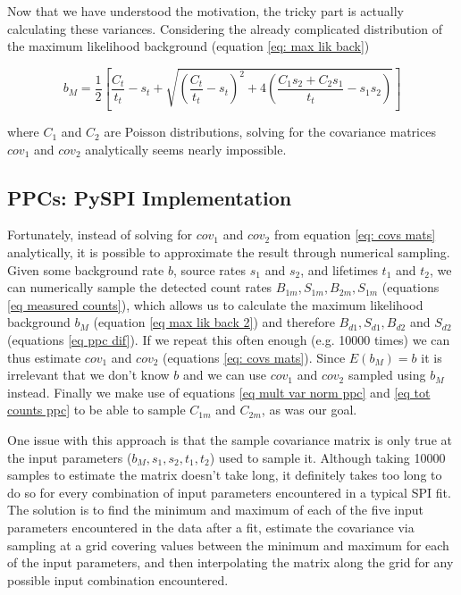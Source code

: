 \documentclass{report}
\begin{document}
Now that we have understood the motivation, the tricky part is actually calculating these variances. Considering the already complicated distribution of the maximum likelihood background (equation \ref{eq: max lik back})

\begin{equation}\label{eq max lik back 2}
  b_M = \frac{1}{2} \left[ \frac{C_t}{t_t} - s_t + \sqrt{\left( \frac{C_t}{t_t} - s_t\right)^2 + 4 \left( \frac{C_1s_2+C_2s_1}{t_t}-s_1s_2\right)}\right]
\end{equation}

where $C_1$ and $C_2$ are Poisson distributions, solving for the covariance matrices $cov_1$ and $cov_2$ analytically seems nearly impossible.


\subsection{PPCs: PySPI Implementation}

Fortunately, instead of solving for $cov_1$ and $cov_2$ from equation \ref{eq: covs mats} analytically, it is possible to approximate the result through numerical sampling. Given some background rate $b$, source rates $s_1$ and $s_2$, and lifetimes $t_1$ and $t_2$, we can numerically sample the detected count rates $B_{1m}, S_{1m}, B_{2m}, S_{1m}$ (equations \ref{eq measured counts}), which allows us to calculate the maximum likelihood background $b_M$ (equation \ref{eq max lik back 2}) and therefore $B_{d1},S_{d1},B_{d2}$ and $S_{d2}$ (equations \ref{eq ppc dif}). If we repeat this often enough (e.g. 10000 times) we can thus estimate $cov_1$ and $cov_2$ (equations \ref{eq: covs mats}). Since $E(b_M) = b$ it is irrelevant that we don't know $b$ and we can use $cov_1$ and $cov_2$ sampled using $b_M$ instead. Finally we make use of equations \ref{eq mult var norm ppc} and \ref{eq tot counts ppc} to be able to sample $C_{1m}$ and $C_{2m}$, as was our goal.

One issue with this approach is that the sample covariance matrix is only true at the input parameters ($b_M,s_1,s_2,t_1,t_2$) used to sample it. Although taking 10000 samples to estimate the matrix doesn't take long, it definitely takes too long to do so for every combination of input parameters encountered in a typical SPI fit. The solution is to find the minimum and maximum of each of the five input parameters encountered in the data after a fit, estimate the covariance via sampling at a grid covering values between the minimum and maximum for each of the input parameters, and then interpolating the matrix along the grid for any possible input combination encountered. 
\end{document}
